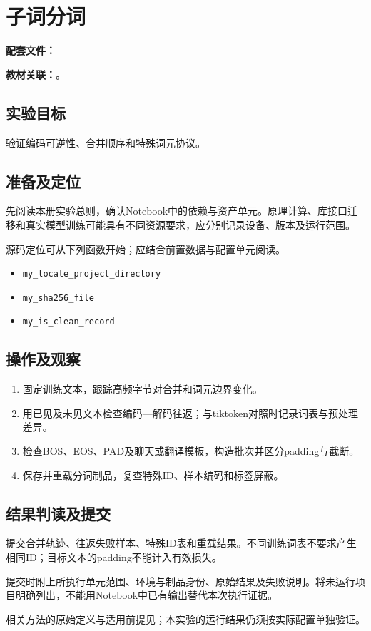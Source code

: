\chapter{子词分词}
\label{lab:21_tokenizer}

\noindent\textbf{配套文件：}\par
\noindent\textbf{教材关联：}。

\section*{实验目标}
验证编码可逆性、合并顺序和特殊词元协议。

\section*{准备及定位}
先阅读本册实验总则，确认Notebook中的依赖与资产单元。原理计算、库接口迁移和真实模型训练可能具有不同资源要求，应分别记录设备、版本及运行范围。

源码定位可从下列函数开始；应结合前置数据与配置单元阅读。
\begin{itemize}
\item \texttt{my\_locate\_project\_directory}
\item \texttt{my\_sha256\_file}
\item \texttt{my\_is\_clean\_record}
\end{itemize}

\section*{操作及观察}
\begin{enumerate}
\item 固定训练文本，跟踪高频字节对合并和词元边界变化。
\item 用已见及未见文本检查编码—解码往返；与tiktoken对照时记录词表与预处理差异。
\item 检查BOS、EOS、PAD及聊天或翻译模板，构造批次并区分padding与截断。
\item 保存并重载分词制品，复查特殊ID、样本编码和标签屏蔽。
\end{enumerate}

\section*{结果判读及提交}
提交合并轨迹、往返失败样本、特殊ID表和重载结果。不同训练词表不要求产生相同ID；目标文本的padding不能计入有效损失。

提交时附上所执行单元范围、环境与制品身份、原始结果及失败说明。将未运行项目明确列出，不能用Notebook中已有输出替代本次执行证据。

相关方法的原始定义与适用前提见\cite{sennrichSubwordUnits2016}；本实验的运行结果仍须按实际配置单独验证。
